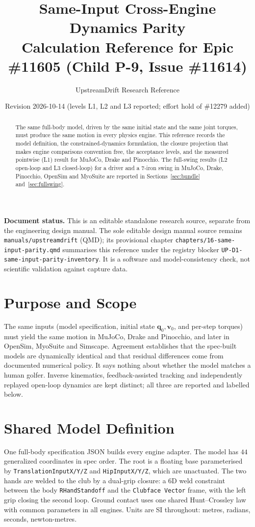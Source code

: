 \documentclass[11pt,a4paper]{article}
\title{Same-Input Cross-Engine Dynamics Parity\\[4pt]
\large Calculation Reference for Epic \#11605 (Child P-9, Issue \#11614)}
\author{UpstreamDrift Research Reference}
\date{Revision 2026-10-14 \quad (levels L1, L2 and L3 reported; effort hold of \#12279 added)}
\newcommand{\bq}{\mathbf{q}}
\newcommand{\bv}{\mathbf{v}}
\begin{document}
\maketitle

\begin{abstract}
The same full-body model, driven by the same initial state and the same joint
torques, must produce the same motion in every physics engine.  This reference
records the model definition, the constrained-dynamics formulation, the
closure projection that makes engine comparisons convention free, the
acceptance levels, and the measured pointwise (L1) result for MuJoCo, Drake and
Pinocchio.  The full-swing results (L2 open-loop and L3 closed-loop) for a driver
and a 7-iron swing in MuJoCo, Drake, Pinocchio, OpenSim and MyoSuite are
reported in Sections~\ref{sec:bundle} and~\ref{sec:fullswing}.
\end{abstract}

\noindent\textbf{Document status.}  This is an editable standalone research
source, separate from the engineering design manual.  The sole editable design
manual source remains \texttt{manuals/upstreamdrift} (QMD); its provisional
chapter \texttt{chapters/16-same-input-parity.qmd} summarises this reference
under the registry blocker \texttt{UP-D1-same-input-parity-inventory}.  It is a software
and model-consistency check, not scientific validation against capture data.

\section{Purpose and Scope}
The same inputs (model specification, initial state $\bq_0,\bv_0$, and per-step
torques) must yield the same motion in MuJoCo, Drake and Pinocchio, and later in
OpenSim, MyoSuite and Simscape.  Agreement establishes that the spec-built
models are dynamically identical and that residual differences come from
documented numerical policy.  It says nothing about whether the model matches a
human golfer.  Inverse kinematics, feedback-assisted tracking and independently
replayed open-loop dynamics are kept distinct; all three are reported and labelled below.

\section{Shared Model Definition}
One full-body specification JSON builds every engine adapter.  The model has
$44$ generalized coordinates in spec order.  The root is a floating base
parameterised by \texttt{TranslationInputX/Y/Z} and \texttt{HipInputX/Y/Z},
which are unactuated.  The two hands are welded to the club by a dual-grip
closure: a 6D weld constraint between the body \texttt{RHandStandoff} and the
\texttt{Clubface Vector} frame, with the left grip closing the second loop.
Ground contact uses one shared Hunt--Crossley law with common parameters in all
engines.  Units are SI throughout: metres, radians, seconds, newton-metres.
\end{document}
